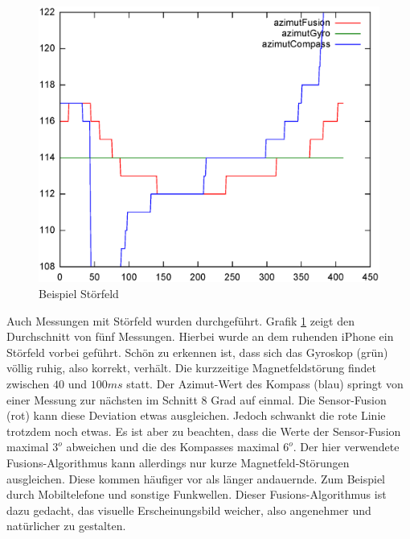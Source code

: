 \begin{figure}[htb]
\centering
\includegraphics[width=\textwidth]{figures/heading007}
\caption{Beispiel Störfeld}
\label{fig:heading007}
\end{figure}
Auch Messungen mit Störfeld wurden durchgeführt. Grafik \ref{fig:heading007} zeigt den Durchschnitt von fünf Messungen. Hierbei wurde an dem ruhenden iPhone ein Störfeld vorbei geführt. Schön zu erkennen ist, dass sich das Gyroskop (grün) völlig ruhig, also korrekt, verhält. Die kurzzeitige Magnetfeldstörung findet zwischen $40$ und $100ms$ statt. Der Azimut-Wert des Kompass (blau) springt von einer Messung zur nächsten im Schnitt 8 Grad auf einmal. Die Sensor-Fusion (rot) kann diese Deviation etwas ausgleichen. Jedoch schwankt die rote Linie trotzdem noch etwas. Es ist aber zu beachten, dass die Werte der Sensor-Fusion maximal $3^o$ abweichen und die des Kompasses maximal $6^o$. %
Der hier verwendete Fusions-Algorithmus kann allerdings nur kurze Magnetfeld-Störungen ausgleichen. Diese kommen häufiger vor als länger andauernde. Zum Beispiel durch Mobiltelefone und sonstige Funkwellen. Dieser Fusions-Algorithmus ist dazu gedacht, das visuelle Erscheinungsbild weicher, also angenehmer und natürlicher zu gestalten.

